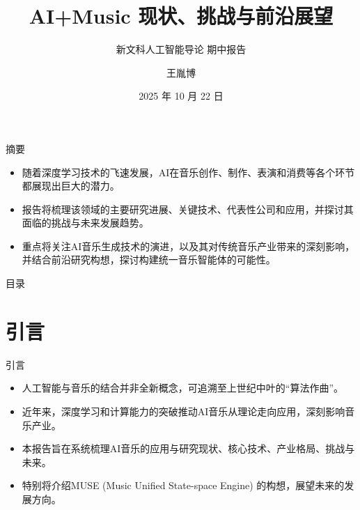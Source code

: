 \documentclass{beamer}
\title[AI+Music]{AI+Music 现状、挑战与前沿展望}
\subtitle{新文科人工智能导论 期中报告}
\author{王胤博}
\date{2025 年 10 月 22 日}
\begin{document}
\begin{frame}
  \titlepage
\end{frame}

\begin{frame}{摘要}
  \begin{itemize}
    \item 随着深度学习技术的飞速发展，AI在音乐创作、制作、表演和消费等各个环节都展现出巨大的潜力。
    \item 报告将梳理该领域的主要研究进展、关键技术、代表性公司和应用，并探讨其面临的挑战与未来发展趋势。
    \item 重点将关注AI音乐生成技术的演进，以及其对传统音乐产业带来的深刻影响，并结合前沿研究构想，探讨构建统一音乐智能体的可能性。
  \end{itemize}
\end{frame}

\begin{frame}{目录}
  \tableofcontents
\end{frame}

\section{引言}
\begin{frame}{引言}
  \begin{itemize}
    \item 人工智能与音乐的结合并非全新概念，可追溯至上世纪中叶的“算法作曲”。
    \item 近年来，深度学习和计算能力的突破推动AI音乐从理论走向应用，深刻影响音乐产业。
    \item 本报告旨在系统梳理AI音乐的应用与研究现状、核心技术、产业格局、挑战与未来。
    \item 特别将介绍MUSE (Music Unified State-space Engine) 的构想，展望未来的发展方向。
  \end{itemize}
\end{frame}
\end{document}
